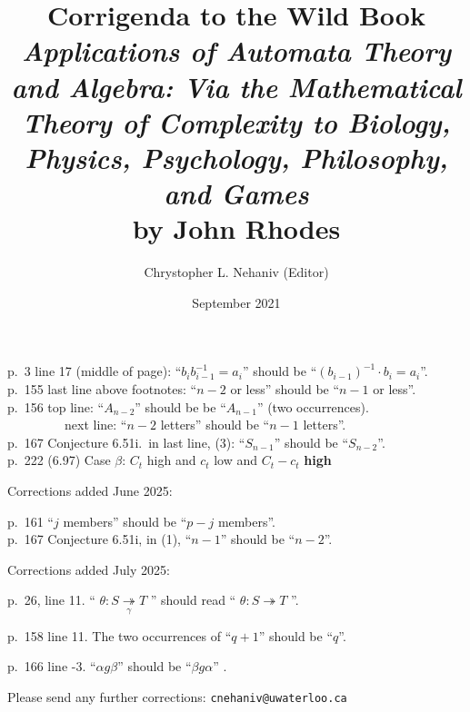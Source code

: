 \documentclass{article}
\title{Corrigenda to the Wild Book\\[1em]
{\em Applications of Automata Theory and Algebra: Via the Mathematical Theory of Complexity to Biology, Physics, Psychology, Philosophy, and Games} \\[1em] by John Rhodes}
\author{Chrystopher L. Nehaniv (Editor)}
\date{\vspace{-1em} September 2021}
\begin{document}
\maketitle



p.\ 3 line 17 (middle of page):   ``$b_i b_{i-1}^{-1}=a_i$'' should be ``$(b_{i-1})^{-1} \cdot b_i=a_i$''. \\

p.\ 155 last line above footnotes:   ``$n-2$ or less'' should be ``$n-1$ or less''.\\

p.\ 156 top line: ``$A_{n-2}$'' should be be ``$A_{n-1}$'' (two occurrences).\\

\ \ \ \ \ \ \ \ \  next line:  ``$n-2$ letters'' should be ``$n-1$ letters''.\\
 
p.\ 167 Conjecture 6.51i.\ in last line,  (3):   ``$S_{n-1}$'' should be ``$S_{n-2}$''.  \\


p.\ 222 (6.97) Case $\beta$:  $C_t$ high and $c_t$ low and $C_t-c_t$ {\bf high}

\vspace{1em}
Corrections added June 2025:
\vspace{1em}

p.\ 161 ``$j$ members'' should be ``$p-j$ members''.\\

p.\ 167 Conjecture 6.51i, in (1), ``$n-1$'' should be ``$n-2$''.

\vspace{1em}
Corrections added July  2025:
\vspace{1em}

p.\ 26, line 11.  `` $\theta: S{\underset{\gamma}{\twoheadrightarrow}}T$ '' 
should read `` $\theta :S{\twoheadrightarrow}T$ ''.

p.\ 158   line 11.  The two occurrences of ``$q+1$'' should be ``$q$''.

p.\ 166 line -3.  ``$\alpha g \beta$'' should be ``$\beta g \alpha$'' . 


\vfill
Please send any further corrections:  {\tt cnehaniv@uwaterloo.ca}
\end{document}

